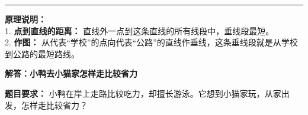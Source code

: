 \documentclass[12pt, a4paper]{ctexart}
\begin{document}
\vspace{1.0cm}
\hrule
\vspace{0.4cm}

{\small
\textbf{原理说明：} \\
1. \textbf{点到直线的距离：} 直线外一点到这条直线的所有线段中，垂线段最短。 \\
2. \textbf{作图：} 从代表“学校”的点向代表“公路”的直线作垂线，这条垂线段就是从学校到公路的最短路线。
}


\newpage

\begin{center}
  {\large\bfseries 解答：小鸭去小猫家怎样走比较省力}
\end{center}

\vspace{0.6cm}

\noindent
{\small \textbf{题目要求：} 小鸭在岸上走路比较吃力，却擅长游泳。它想到小猫家玩，从家出发，怎样走比较省力？}

\vspace{0.8cm}
\end{document}
